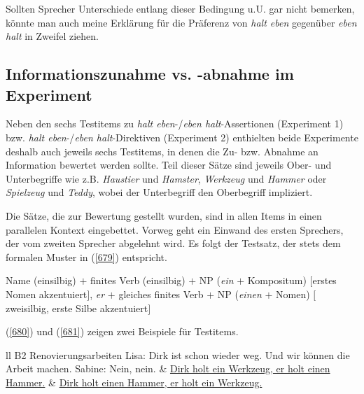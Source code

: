 Sollten Sprecher Unterschiede entlang dieser Bedingung u.U. gar nicht bemerken, könnte man auch meine Erklärung für die Präferenz von \textit{halt eben} gegen\-über \textit{eben halt} in Zweifel ziehen.
		
\subsection{Informationszunahme vs. -abnahme im Experiment}
Neben den sechs Testitems zu \textit{halt eben}-/\textit{eben halt}-Assertionen (Experiment 1) bzw. \textit{halt eben}-/\textit{eben halt}-Direktiven (Experiment 2) enthielten beide Experimente deshalb auch jeweils sechs Testitems, in denen die Zu- bzw. Abnahme  an Information bewertet werden sollte. Teil dieser Sätze sind jeweils Ober- und Unterbegriffe wie z.B. \textit{Haustier} und \textit{Hamster}, \textit{Werkzeug} und \textit{Hammer} oder \textit{Spielzeug} und \textit{Teddy}, wobei der Unterbegriff den Oberbegriff impliziert. 
	
Die Sätze, die zur Bewertung gestellt wurden, sind in allen Items in einen pa\-rallelen Kontext eingebettet. Vorweg geht ein Einwand des ersten Sprechers, der vom zweiten Sprecher abgelehnt wird. Es folgt der Testsatz, der stets dem formalen Muster in (\ref{679}) entspricht.

\begin{exe}
	\ex\label{679} 
	Name (einsilbig) $+$ finites Verb (einsilbig) $+$ NP (\textit{ein} $+$ Kompositum) $[$erstes Nomen akzentuiert$]$, \textit{er} $+$ gleiches finites Verb $+$ NP (\textit{einen} $+$ Nomen) $[$zweisilbig, erste Silbe akzentuiert$]$
\end{exe}
(\ref{680}) und (\ref{681}) zeigen zwei Beispiele für Testitems.

\begin{exe}
	\ex\label{680}
	\begin{tabular}[t]{ll}
	 {B2 Renovierungsarbeiten} \tabularnewline
	 {Lisa: Dirk ist schon wieder weg. Und wir können die Arbeit machen.} \tabularnewline
	Sabine: Nein, nein. & \underline{Dirk holt ein Werkzeug, er holt einen Hammer.} \tabularnewline
	{} & \underline{Dirk holt einen Hammer, er holt ein Werkzeug.}
    \end{tabular}
\end{exe}

